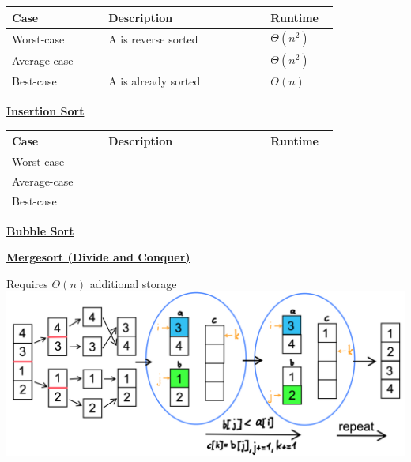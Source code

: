         
        
        \begin{tabular*}{\linewidth}{| p{0.25\linewidth} | p{0.42\linewidth} | p{0.15\linewidth} |}
            \hline
            Case & Description & Runtime\\
            \hline \hline
            Worst-case & A is reverse sorted & $\Theta(n^2)$ \\
            \hline
            Average-case & - & $\Theta(n^2)$ \\
            \hline
            Best-case & A is already sorted & $\Theta(n)$ \\
            \hline
        \end{tabular*}

    {\centering\underline{\textbf{Insertion Sort}} \par}
        \begin{tabular*}{\linewidth}{| p{0.25\linewidth} | p{0.42\linewidth} | p{0.15\linewidth} |}
            \hline
            Case & Description & Runtime\\
            \hline \hline
            Worst-case &  &  \\
            \hline
            Average-case &  &  \\
            \hline
            Best-case &  &  \\
            \hline
        \end{tabular*}

    {\centering\underline{\textbf{Bubble Sort}} \par}
        
    {\centering\underline{\textbf{Mergesort (Divide and Conquer)}} \par}
        Requires $\Theta(n)$ additional storage\\
        \includegraphics[width = \linewidth]{src/3_containers/images/mergesort.png}
          

